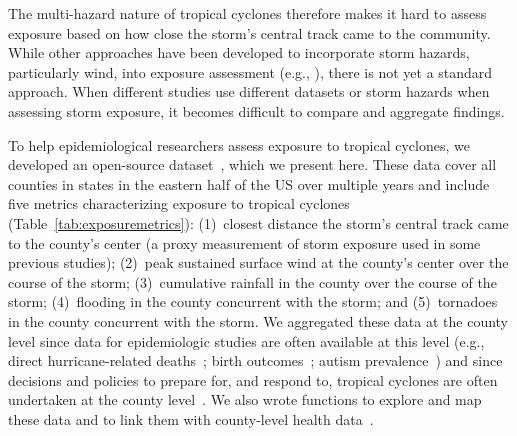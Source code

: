 The multi-hazard nature of tropical cyclones therefore makes it hard to assess
exposure based on how close the storm's central track came to the community.
While other approaches have been developed to incorporate storm hazards,
particularly wind, into exposure assessment (e.g., \cite{grabich2015measuring,
zandbergen2009, czajkowski2011}), there is not yet a standard approach. 
When different studies use different datasets or storm hazards when assessing
storm exposure, it becomes difficult to compare and aggregate findings. 

To help epidemiological researchers assess exposure to tropical cyclones, we
developed an open-source dataset~\parencite{hurricaneexposure}, which we
present here.  These data cover all counties in states in the eastern half of
the \ac{US} over multiple years and include five metrics characterizing
exposure to tropical cyclones (Table~\ref{tab:exposuremetrics}): (1)~closest
distance the storm's central track came to the county's center (a proxy
measurement of storm exposure used in some previous studies); (2)~peak
sustained surface wind at the county's center over the course of the storm;
(3)~cumulative rainfall in the county over the course of the storm;
(4)~flooding in the county concurrent with the storm; and (5)~tornadoes in the
county concurrent with the storm.  We aggregated these data at the county level
since data for epidemiologic studies are often available at this level (e.g.,
direct hurricane-related deaths~\parencite{czajkowski2011}; birth
outcomes~\parencite{grabich2015, grabich2015measuring}; autism
prevalence~\parencite{kinney2008}) and since decisions and policies to prepare
for, and respond to, tropical cyclones are often undertaken at the county
level~\parencite{zandbergen2009, rappaport2000}.  We also wrote functions to
explore and map these data and to link them with county-level health
data~\parencite{hurricaneexposuredata}.  

